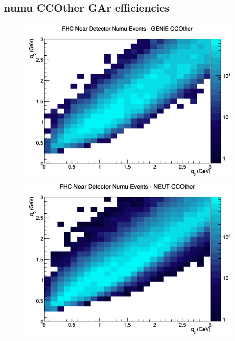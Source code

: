 \documentclass[12pt]{article}
\begin{document}
\subsection{numu CCOther GAr efficiencies}
\begin{figure}[h]
\includegraphics[width=\linewidth]{eff_q0_q3/GAr/CCOther_FHC_ND_numu_q3_q0_GENIE.png}
\endminipage
{}
\includegraphics[width=\linewidth]{eff_q0_q3/GAr/CCOther_FHC_ND_numu_q3_q0_NEUT.png}
\endminipage
{}

\end{figure}
\end{document}
